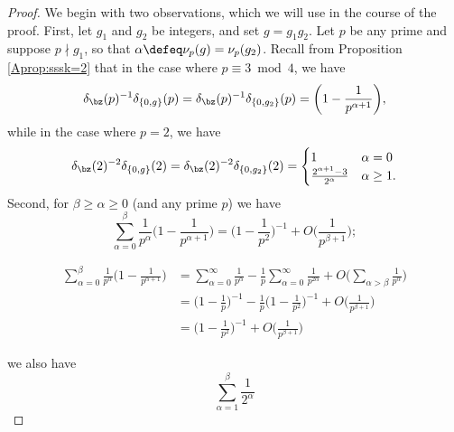 \documentclass[12pt, reqno, twoside, letterpaper]{amsart}
\begin{document}
\begin{jetsam}
\begin{proof}
%
We begin with two observations, which we will use in the course of 
the proof.
%
First, let $g_1$ and $g_2$ be integers, and set $g = g_1g_2$.
%
Let $p$ be any prime and suppose $p \nmid g_1$, so that 
$\alpha \defeq \nu_p(g) = \nu_p(g_2)$.
%
Recall from Proposition \ref{Aprop:sssk=2} that in the case 
where $p \equiv 3 \bmod 4$, we have
\begin{equation*}
  \delta_{\bz}(p)^{-1}\delta_{\{0,g\}}(p)
   = 
    \delta_{\bz}(p)^{-1}\delta_{\{0,g_2\}}(p)
     =
       \bigg(1 - \frac{1}{p^{\alpha + 1}}\bigg),
\end{equation*}
while in the case where $p = 2$, we have 
\begin{equation*}
  \delta_{\bz}(2)^{-2}\delta_{\{0,g\}}(2)
   = 
    \delta_{\bz}(2)^{-2}\delta_{\{0,g_2\}}(2)
     =
        \begin{cases}
         1                                     & \alpha = 0    \\
         \frac{2^{\alpha + 1} - 3}{2^{\alpha}} & \alpha \ge 1.
        \end{cases}
\end{equation*}
%
Second, for $\beta \ge \alpha \ge 0$ (and any prime $p$) we have 
\begin{equation}
 \label{eq:ssak=2prepf1}
  \sum_{\alpha = 0}^{\beta}
   \frac{1}{p^{\alpha}}
    \bigg(1 - \frac{1}{p^{\alpha + 1}}\bigg)
     =
      \bigg(1 - \frac{1}{p^2}\bigg)^{-1}
      +
       O\bigg(\frac{1}{p^{\beta + 1}}\bigg);
\end{equation}
%
\begin{nixnix}
%
\begin{align*}
   \sum_{\alpha = 0}^{\beta}
    \frac{1}{p^{\alpha}}
     \bigg(1 - \frac{1}{p^{\alpha + 1}}\bigg)
 & = 
  \sum_{\alpha = 0}^{\infty} \frac{1}{p^{\alpha}}
   -
    \frac{1}{p}
     \sum_{\alpha = 0}^{\infty} \frac{1}{p^{2\alpha}}
      +
       O\bigg(\sum_{\alpha > \beta} \frac{1}{p^{\alpha}}\bigg)
 \\
 & = 
  \bigg(1 - \frac{1}{p}\bigg)^{-1}
   -
    \frac{1}{p}
     \bigg(1 - \frac{1}{p^2}\bigg)^{-1}
     +
      O\bigg(\frac{1}{p^{\beta + 1}}\bigg)
 \\
 & = 
  \bigg(1 - \frac{1}{p^2}\bigg)^{-1}
     +
      O\bigg(\frac{1}{p^{\beta + 1}}\bigg) 
\end{align*}
%
\end{nixnix}
%
we also have 
\begin{equation}
 \label{eq:ssak=2prepf2}
  \sum_{\alpha = 1}^{\beta}
   \frac{1}{2^{\alpha}}

\end{equation}
\end{proof}
\end{jetsam}
\end{document}
